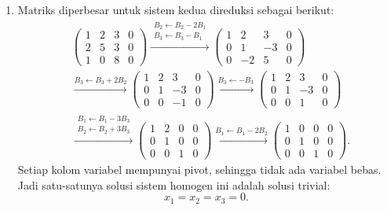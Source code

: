 \documentclass[11pt,a4paper]{article}
\begin{document}
\begin{enumerate}
\begin{enumerate}
\item
Matriks diperbesar untuk sistem kedua direduksi sebagai berikut:
\begin{align*}
    &\left(\begin{array}{ccc|c}
        1&2&3&0\\
        2&5&3&0\\
        1&0&8&0
    \end{array}\right)
    \xrightarrow{\substack{B_2\leftarrow B_2-2B_1\\
                            B_3\leftarrow B_3-B_1}}
    \left(\begin{array}{ccc|c}
        1&2&3&0\\
        0&1&-3&0\\
        0&-2&5&0
    \end{array}\right)
    \\[1em]
    &\xrightarrow{B_3\leftarrow B_3+2B_2}
    \left(\begin{array}{ccc|c}
        1&2&3&0\\
        0&1&-3&0\\
        0&0&-1&0
    \end{array}\right)
    \xrightarrow{B_3\leftarrow-B_3}
    \left(\begin{array}{ccc|c}
        1&2&3&0\\
        0&1&-3&0\\
        0&0&1&0
    \end{array}\right)
    \\[1em]
    &\xrightarrow{\substack{B_1\leftarrow B_1-3B_3\\
                            B_2\leftarrow B_2+3B_3}}
    \left(\begin{array}{ccc|c}
        1&2&0&0\\
        0&1&0&0\\
        0&0&1&0
    \end{array}\right)
    \xrightarrow{B_1\leftarrow B_1-2B_2}
    \left(\begin{array}{ccc|c}
        1&0&0&0\\
        0&1&0&0\\
        0&0&1&0
    \end{array}\right).
\end{align*}
Setiap kolom variabel mempunyai pivot, sehingga tidak ada variabel
bebas. Jadi satu-satunya solusi sistem homogen ini adalah solusi trivial:
\[
    \boxed{x_1=x_2=x_3=0}.
\]
\end{enumerate}


\end{enumerate}
\end{document}
